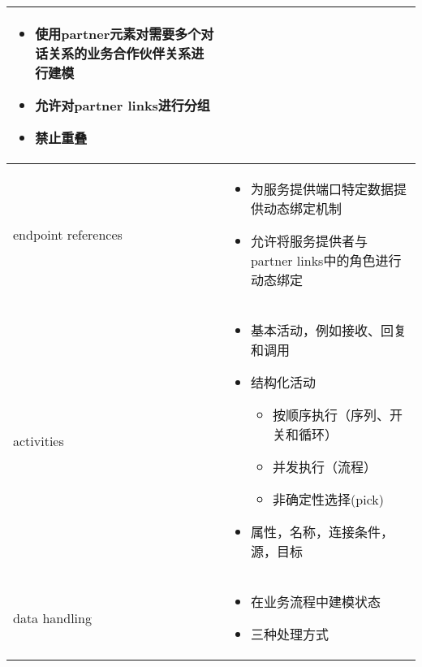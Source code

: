\begin{longtable}{|m{3.7cm}<{\centering}|m{11cm}|}
\begin{itemize}[leftmargin=1.5em,itemsep=-2pt]
        \item 使用partner元素对需要多个对话关系的业务合作伙伴关系进行建模
        \item 允许对partner links进行分组
        \item 禁止重叠
    \vspace{-1.5em}
    \end{itemize}                                           
    \\ \hline
    endpoint references &
    \vspace{-1.3em}
    \begin{itemize}[leftmargin=1.5em,itemsep=-2pt]
        \item 为服务提供端口特定数据提供动态绑定机制
        \item 允许将服务提供者与partner links中的角色进行动态绑定
    \vspace{-1.5em}
    \end{itemize}                                           
    \\ \hline
    activities &
    \vspace{-1.3em}
    \begin{itemize}[leftmargin=1.5em,itemsep=-2pt]
        \item 基本活动，例如接收、回复和调用
        \item 结构化活动
        \vspace{-0.2em}
        \begin{itemize}[leftmargin=1.5em,itemsep=-2pt]
            \item 按顺序执行（序列、开关和循环）
            \item 并发执行（流程）
            \item 非确定性选择(pick)
        \end{itemize}
        \item 属性，名称，连接条件，源，目标
    \vspace{-1.5em}
    \end{itemize}                                           
    \\ \hline
    data handling &
    \vspace{-1.3em}
    \begin{itemize}[leftmargin=1.5em,itemsep=-2pt]
        \item 在业务流程中建模状态
        \item 三种处理方式
        \vspace{-1em}
        \begin{multicols}{3}
        \begin{itemize}

\end{itemize}
\end{multicols}
\end{itemize}
\end{longtable}
